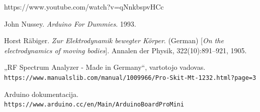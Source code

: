 \documentclass{VUMIFPSkursinis}
\begin{document}
https://www.youtube.com/watch?v=qNnkbspvHCc

\begin{thebibliography}{9}
	John Nussey.
	\textit{Arduino For Dummies}. 
	1993.
	
	Horst Räbiger. 
	\textit{Zur Elektrodynamik bewegter K{\"o}rper}. (German) 
	[\textit{On the electrodynamics of moving bodies}]. 
	Annalen der Physik, 322(10):891–921, 1905.
	
	„RF Spectrum Analyzer - Made in Germany“, vartotojo vadovas.
	\\\texttt{https://www.manualslib.com/manual/1009966/Pro-Skit-Mt-1232.html?page=3}
	
	Arduino dokumentacija.
	\\\texttt{https://www.arduino.cc/en/Main/ArduinoBoardProMini}
	
\end{thebibliography}
\end{document}
